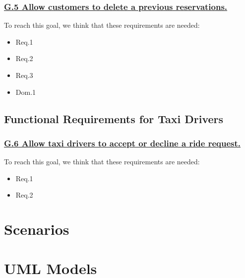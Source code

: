 \documentclass{report}
\begin{document}
			\subsubsection{\lbrack \hyperref[sec:g5]{G.5 Allow customers to delete a previous reservations.}\rbrack}
			To reach this goal, we think that these requirements are needed:


				\begin{itemize}
					\item \lbrack Req.1\rbrack \label{sec:fr1_g5}
					\item \lbrack Req.2\rbrack \label{sec:fr2_g5} 
					\item \lbrack Req.3\rbrack \label{sec:fr3_g5} 
					\item \lbrack Dom.1\rbrack \label{sec:da1_g5} 
				\end{itemize}

		\subsection{Functional Requirements for Taxi Drivers}

			\subsubsection{\lbrack \hyperref[sec:g6]{G.6 Allow taxi drivers to accept or decline a ride request.}\rbrack}
			To reach this goal, we think that these requirements are needed:


				\begin{itemize}
					\item \lbrack Req.1\rbrack \label{sec:fr1_g6} 
					\item \lbrack Req.2\rbrack \label{sec:fr2_g6} 
				\end{itemize}


	\section{Scenarios}


	\section{UML Models}
\end{document}
